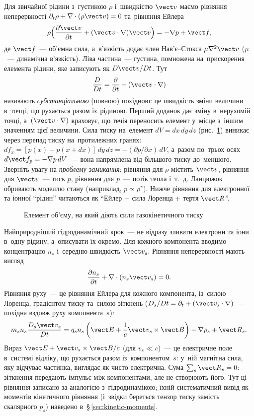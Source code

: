 \begin{Theory}
Для звичайної рідини з~густиною $\rho$ і~швидкістю $\vect v$ маємо рівняння неперервності
$\partial_t\rho+\nabla\cdot(\rho\vect v)=0$ та~рівняння Ейлера
\[\rho\Bigl(\frac{\partial\vect v}{\partial t}+(\vect v\cdot\nabla)\vect v\Bigr)=-\nabla p+\vect f,\]
де $\vect f$~--- об'ємна сила, а~в'язкість додає член Нав'є--Стокса $\mu\nabla^2\vect v$ ($\mu$~--- динамічна в'язкість).
Ліва частина~--- густина, помножена на~прискорення елемента рідини, яке записують як $D\vect v/Dt$.
Тут
\[\frac{D}{Dt}=\frac{\partial}{\partial t}+(\vect v\cdot\nabla)\]
називають \emph{субстанціальною} (повною) похідною: це швидкість зміни величини в~точці, що рухається
разом із~рідиною. Перший доданок дає зміну в~нерухомій точці, а~$(\vect v\cdot\nabla)$ враховує, що течія
переносить елемент у~місце з~іншим значенням цієї величини. Сила тиску на~елемент
$dV=dx\,dy\,dz$ (рис.~\ref{pic:volume-element}) виникає через перепад тиску на~протилежних гранях:
$df_x=[p(x)-p(x+dx)]\,dy\,dz=-(\partial p/\partial x)\,dV$, а~разом по~трьох осях
$d\vect f_p=-\nabla p\,dV$~--- вона напрямлена від більшого тиску до~меншого. Зверніть увагу
на \emph{проблему замикання}: рівняння для $\rho$ містить $\vect v$, рівняння для $\vect v$~--- тиск $p$,
рівняння для $p$~--- потік тепла і~т.~д. Ланцюжок обривають моделлю стану (наприклад, $p\propto\rho^\gamma$).
Нижче рівняння для електронної та іонної \enquote{рідин} читаються як \enquote{Ейлер + сила Лоренца + тертя $\vect R$}.
\end{Theory}

\begin{figure}[ht]
    \centering
    \caption{Елемент об'єму, на який діють сили газокінетичного тиску}
    \label{pic:volume-element}
\end{figure}

Найприродніший гідродинамічний крок~--- не відразу зливати електрони та іони в~одну
рідину, а~описувати їх окремо. Для кожного компонента вводимо концентрацію $n_s$ і~середню
швидкість $\vect v_s$. Рівняння неперервності мають вигляд
\begin{equation*}
 \frac{\partial n_s}{\partial t}
 +\nabla\cdot(n_s\vect v_s)=0.
\end{equation*}
Рівняння руху~--- це рівняння Ейлера для кожного компонента, із~силою Лоренца, градієнтом тиску та~силою зіткнень
($D_s/Dt=\partial_t+(\vect v_s\cdot\nabla)$~--- похідна вздовж руху компонента~$s$):
\begin{equation*}
 m_s n_s\frac{D_s\vect v_s}{Dt}
 =
 q_s n_s\left(\vect E+\frac1c\vect v_s\times\vect B\right)
 -\nabla p_s+\vect R_s.
\end{equation*}
Вираз $\vect E+\vect v_s\times\vect B/c$ (для $v_s\ll c$)~--- це електричне поле в~системі відліку, що рухається разом
із~компонентом~$s$: у~ній магнітна сила, яку відчуває частинка, виглядає як чисто електрична.
Сума $\sum_s\vect R_s=0$: зіткнення передають імпульс між компонентами, але не створюють
його. Тут ці рівняння записано за аналогією з~гідродинамікою; їхній систематичний вивід як
моментів кінетичного рівняння (і~звідки береться тензор тиску замість скалярного $p_s$) наведено
в~§\,\ref{sec:kinetic-moments}.

